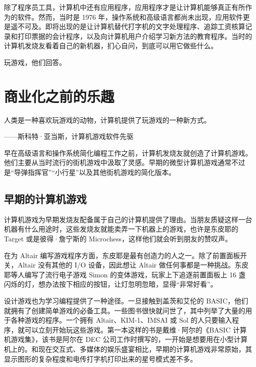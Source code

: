 \documentclass[12pt,UTF8]{ctexbook}
\begin{document}
除了程序员工具，计算机中还有应用程序，应用程序才是让计算机能够真正有所作为的软件。然而，当时是 1976 年，操作系统和高级语言都尚未出现，应用软件更是遥不可及。即将出现的是让计算机替代打字机的文字处理程序、追踪工资核算记录和打印票据的会计程序，以及向计算机用户介绍学习新方法的教育程序。当时的计算机发烧友看着自己的新机器，扪心自问，到底可以用它做些什么。

玩游戏，他们回答。





\section{商业化之前的乐趣}


人类是一种喜欢玩游戏的动物，计算机提供了玩游戏的一种新方式。

——斯科特·亚当斯，计算机游戏软件先驱



早在高级语言和操作系统简化编程工作之前，计算机发烧友就创造了计算机游戏。他们主要从当时流行的街机游戏中汲取了灵感。早期的微型计算机游戏通常不过是“导弹指挥官”“小行星”以及其他街机游戏的简化版本。





\subsection{早期的计算机游戏}


计算机游戏为早期发烧友配备属于自己的计算机提供了理由。当朋友质疑这样一台机器有什么用途时，这些发烧友就能卖弄一下机器上的游戏，也许是东皮耶的 Target 或是彼得·詹宁斯的 Microchess，这样他们就会听到朋友的赞叹声。

在为 Altair 编写游戏程序方面，东皮耶是最有创造力的人之一。除了前置面板开关，Altair 没有其他的 I/O 设备，因此想让 Altair 做任何事都是一种挑战。东皮耶等人编写了流行电子游戏 Simon 的变体游戏，玩家上下追逐前置面板上 16 盏闪烁的灯，想办法按下相应的按钮，让灯忽明忽暗，显得“非常好看”。

设计游戏也为学习编程提供了一种途径。一旦接触到盖茨和艾伦的 BASIC，他们就拥有了创建简单游戏的必备工具。一些图书很快就问世了，其中列举了大量的用于各种游戏的程序。一个拥有 Altair、KIM-1、IMSAI 或 Sol 的人只要输入程序，就可以立刻开始玩这些游戏。第一本这样的书是戴维·阿尔的《BASIC 计算机游戏集》，该书是阿尔在 DEC 公司工作时撰写的，一开始是想要用在小型计算机上的。和现在交互式、多媒体的娱乐盛宴相比，早期的计算机游戏非常原始，其显示图形的复杂程度和电传打字机打印出来的星号模式差不多。
\end{document}
